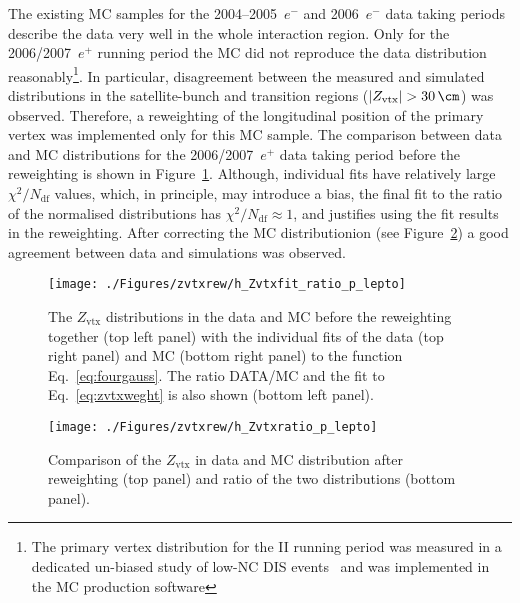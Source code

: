 The existing MC samples for the 2004--2005~$e^-$ and 2006~$e^-$ data taking periods describe the data very well in the whole interaction region. Only for the 2006/2007~$e^+$ running period the MC did not reproduce the data distribution reasonably\footnote{The primary vertex distribution for the \hera II running period was measured in a dedicated un-biased study of low-\qsq NC DIS events~\cite{upub:oliver:zn07008} and was implemented in the MC production software}. In particular, disagreement between the measured and simulated distributions in the satellite-bunch and transition regions ($\left|Z_{\text{vtx}}\right|>30\,\cm$) was observed. Therefore, a reweighting of the longitudinal position of the primary vertex was implemented only for this MC sample. The comparison between data and MC distributions for the 2006/2007~$e^+$ data taking period before the reweighting is shown in Figure~\ref{fig:zvtxrew}. Although, individual fits have relatively large $\chi^2/N_\text{df}$ values, which, in principle, may introduce a bias, the final fit to the ratio of the normalised distributions has $\chi^2/N_\text{df}\approx 1$, and justifies using the fit results in the reweighting. After correcting the MC distributionion (see Figure~\ref{fig:zvtxrewaf}) a good agreement between data and simulations was observed.
\begin{figure}[t]
\begin{center}
 \hspace{-35pt}\texttt{[image: ./Figures/zvtxrew/h\_Zvtxfit\_ratio\_p\_lepto]}%
\end{center}
\caption{The $Z_\text{vtx}$ distributions in the data and \lepto MC before the reweighting together (top left panel) with the individual fits of the data (top right panel) and MC (bottom right panel) to the function Eq.~\eqref{eq:fourgauss}. The ratio DATA/MC and the fit to Eq.~\eqref{eq:zvtxweght} is also shown (bottom left panel).} 
\label{fig:zvtxrew}
\end{figure}

\begin{figure}[p]
\begin{center}
 \texttt{[image: ./Figures/zvtxrew/h\_Zvtxratio\_p\_lepto]}
\end{center}
\caption{Comparison of the $Z_\text{vtx}$ in data and \lepto MC distribution after reweighting (top panel) and ratio of the two distributions (bottom panel).} 
\label{fig:zvtxrewaf}
\end{figure}